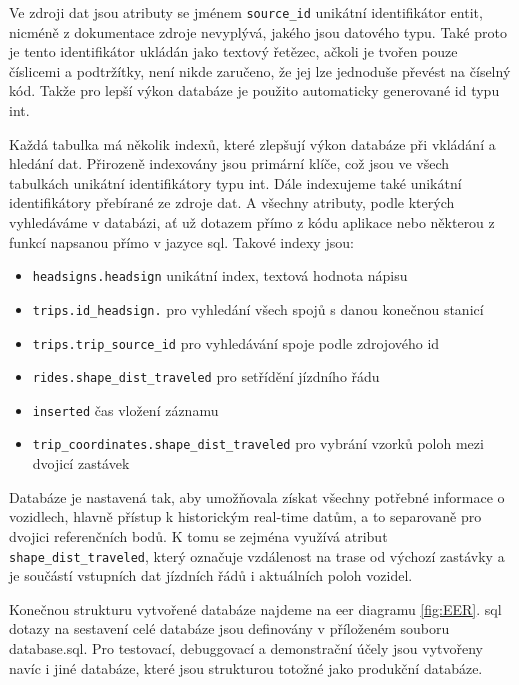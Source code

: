 Ve zdroji dat jsou atributy se jménem \verb-source_id- unikátní identifikátor entit, nicméně z dokumentace zdroje nevyplývá, jakého jsou datového typu. Také proto je tento identifikátor ukládán jako textový řetězec, ačkoli je tvořen pouze číslicemi a podtržítky, není nikde zaručeno, že jej lze jednoduše převést na číselný kód. Takže pro lepší výkon databáze je použito automaticky generované id typu \gls{int}.


\bigbreak


Každá tabulka má několik indexů, které zlepšují výkon databáze při vkládání a hledání dat. Přirozeně indexovány jsou primární klíče, což jsou ve všech tabulkách unikátní identifikátory typu \gls{int}. Dále indexujeme také unikátní identifikátory přebírané ze zdroje dat. A všechny atributy, podle kterých vyhledáváme v databázi, ať už dotazem přímo z kódu aplikace nebo některou z funkcí napsanou přímo v jazyce \gls{sql}. Takové indexy jsou:


\begin{itemize}


\item \verb-headsigns.headsign- unikátní index, textová hodnota nápisu


\item \verb-trips.id_headsign.- pro vyhledání všech spojů s danou konečnou stanicí


\item \verb-trips.trip_source_id- pro vyhledávání spoje podle zdrojového id


\item \verb-rides.shape_dist_traveled- pro setřídění jízdního řádu
\item \verb-inserted- čas vložení záznamu


\item \verb-trip_coordinates.shape_dist_traveled- pro vybrání vzorků poloh mezi dvojicí zastávek


\end{itemize}


\bigbreak


Databáze je nastavená tak, aby umožňovala získat všechny potřebné informace o vozidlech, hlavně přístup k historickým real-time datům, a to separovaně pro dvojici referenčních bodů. K tomu se zejména využívá atribut \verb-shape_dist_traveled-, který označuje vzdálenost na trase od výchozí zastávky a je součástí vstupních dat jízdních řádů i aktuálních poloh vozidel.

\bigbreak

Konečnou strukturu vytvořené databáze najdeme na \gls{eer} diagramu \ref{fig:EER}. \gls{sql} dotazy na sestavení celé databáze jsou definovány v příloženém souboru database.sql. Pro testovací, debuggovací a demonstrační účely jsou vytvořeny navíc i jiné databáze, které jsou strukturou totožné jako produkční databáze.

